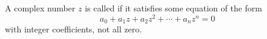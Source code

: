 A complex number $z$ is called  if it satisfies some equation of the form
$$a_0 + a_1 z + a_2 z^2 + \cdots + a_n z^n = 0$$
with integer coefficients, not all zero.
